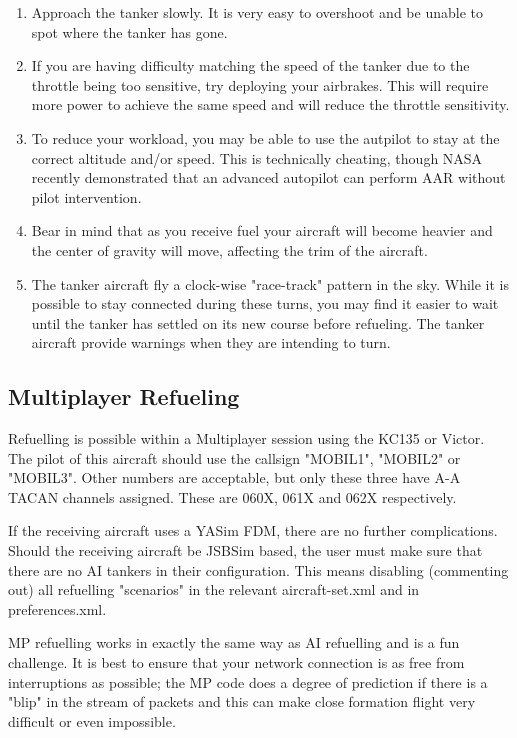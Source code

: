 \begin{enumerate}
\item Approach the tanker slowly. It is very easy to overshoot and be unable to
spot where the tanker has gone.
\item If you are having difficulty matching the speed of the tanker due to the
throttle being too sensitive, try deploying your airbrakes. This will require
more power to achieve the same speed and will reduce the throttle sensitivity.
\item To reduce your workload, you may be able to use the autpilot to stay at
the correct altitude and/or speed. This is technically cheating, though NASA
recently demonstrated that an advanced autopilot can perform AAR without pilot
intervention.
\item Bear in mind that as you receive fuel your aircraft will become heavier
and the center of gravity will move, affecting the trim of the aircraft.
\item The tanker aircraft fly a clock-wise "race-track" pattern in the sky.
While it is possible to stay connected during these turns, you may find it
easier to wait until the tanker has settled on its new course before refueling.
The tanker aircraft provide warnings when they are intending to turn.
\end{enumerate}

\subsection{Multiplayer Refueling}

Refuelling is possible within a Multiplayer session using the KC135 or Victor.
The pilot of this aircraft should use the callsign "MOBIL1", "MOBIL2" or "MOBIL3".
Other numbers are acceptable, but only these three have A-A TACAN
channels assigned.  These are 060X, 061X and 062X respectively.

If the receiving aircraft uses a YASim FDM, there are no further
complications.  Should the receiving aircraft be JSBSim based, the user
must make sure that there are no AI tankers in their configuration.
This means disabling (commenting out) all refuelling "scenarios" in the
relevant aircraft-set.xml and in preferences.xml.

MP refuelling works in exactly the same way as AI refuelling and is a
fun challenge.  It is best to ensure that your network connection is as
free from interruptions as possible; the MP code does a degree of
prediction if there is a "blip" in the stream of packets and this can
make close formation flight very difficult or even impossible.

